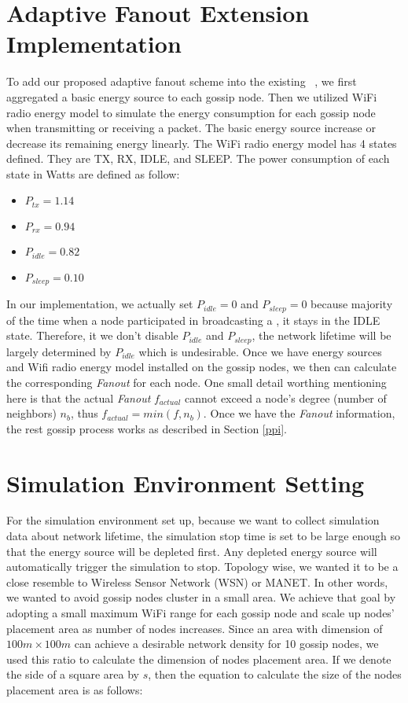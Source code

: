 \section{Adaptive Fanout Extension Implementation}

To add our proposed adaptive fanout scheme into the existing \pp ~\gp, we first aggregated a basic energy source to each gossip node. Then we utilized WiFi radio energy model to simulate the energy consumption for each gossip node when transmitting or receiving a packet. The basic energy source increase or decrease its remaining energy linearly. The WiFi radio energy model has 4 states defined. They are TX, RX, IDLE, and SLEEP. The power consumption of each state in Watts are defined as follow:

\begin{itemize}
	\item $P_{tx}=1.14$
	\item $P_{rx}=0.94$
	\item $P_{idle}=0.82$
	\item $P_{sleep}=0.10$
\end{itemize}

In our implementation, we actually set $P_{idle}=0$ and $P_{sleep}=0$ because majority of the time when a node participated in broadcasting a \msg, it stays in the IDLE state. Therefore, it we don't disable $P_{idle}$ and $P_{sleep}$, the network lifetime will be largely determined by $P_{idle}$ which is undesirable. Once we have energy sources and Wifi radio energy model installed on the gossip nodes, we then can calculate the corresponding \emph{Fanout} for each node. One small detail worthing mentioning here is that the actual \emph{Fanout} $f_{actual}$ cannot exceed a node's degree (number of neighbors) $n_b$, thus $f_{actual} = min(f, n_b)$. Once we have the \emph{Fanout} information, the rest gossip process works as described in Section \ref{ppi}.

\section{Simulation Environment Setting}
For the simulation environment set up, because we want to collect simulation data about network lifetime, the simulation stop time is set to be large enough so that the energy source will be depleted first. Any depleted energy source will automatically trigger the simulation to stop. Topology wise, we wanted it to be a close resemble to Wireless Sensor Network (WSN) or MANET. In other words, we wanted to avoid gossip nodes cluster in a small area. We achieve that goal by adopting a small maximum WiFi range for each gossip node and scale up nodes' placement area as number of nodes increases. Since an area with dimension of $100m \times 100m$ can achieve a desirable network density for 10 gossip nodes, we used this ratio to calculate the dimension of nodes placement area. If we denote the side of a square area by $s$, then the equation to calculate the size of the nodes placement area is as follows:

